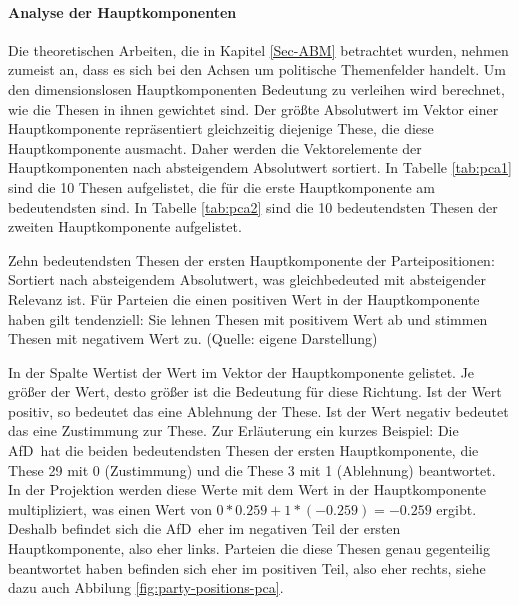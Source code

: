 \paragraph{Analyse der Hauptkomponenten}
Die theoretischen Arbeiten, die in Kapitel \ref{Sec-ABM} betrachtet wurden, nehmen zumeist an, dass es sich bei den Achsen um politische Themenfelder handelt.
Um den dimensionslosen Hauptkomponenten Bedeutung zu verleihen wird berechnet, wie die Thesen in ihnen gewichtet sind. Der größte Absolutwert im Vektor einer Hauptkomponente repräsentiert gleichzeitig diejenige These, die diese Hauptkomponente ausmacht. Daher werden die Vektorelemente der Hauptkomponenten nach absteigendem Absolutwert sortiert.
In Tabelle \ref{tab:pca1} sind die 10 Thesen aufgelistet, die für die erste Hauptkomponente am bedeutendsten sind. In Tabelle \ref{tab:pca2} sind die 10 bedeutendsten Thesen der zweiten Hauptkomponente aufgelistet.

\begin{table}[htb]
	\centering
	\caption{Zehn bedeutendsten Thesen der ersten Hauptkomponente der Parteipositionen: Sortiert nach absteigendem Absolutwert, was gleichbedeuted mit absteigender Relevanz ist. Für Parteien die einen positiven Wert in der Hauptkomponente haben gilt tendenziell: Sie lehnen Thesen mit positivem Wert ab und stimmen Thesen mit negativem Wert zu. (Quelle: eigene Darstellung)}
	\label{tab:pca1}
\end{table}

In der Spalte \glqq Wert\grqq ist der Wert im Vektor der Hauptkomponente gelistet. Je größer der Wert, desto größer ist die Bedeutung für diese Richtung. Ist der Wert positiv, so bedeutet das eine Ablehnung der These. Ist der Wert negativ bedeutet das eine Zustimmung zur These.
Zur Erläuterung ein kurzes Beispiel: Die \glqq AfD\grqq\ hat die beiden bedeutendsten Thesen der ersten Hauptkomponente, die These 29 mit 0 (Zustimmung) und die These 3 mit 1 (Ablehnung) beantwortet. In der Projektion werden diese Werte mit dem Wert in der Hauptkomponente multipliziert, was einen Wert von $0*0.259+1*(-0.259)=-0.259$ ergibt. Deshalb befindet sich die \glqq AfD\grqq\ eher im negativen Teil der ersten Hauptkomponente, also eher links. Parteien die diese Thesen genau gegenteilig beantwortet haben befinden sich eher im positiven Teil, also eher rechts, siehe dazu auch Abbilung \ref{fig:party-positions-pca}.

